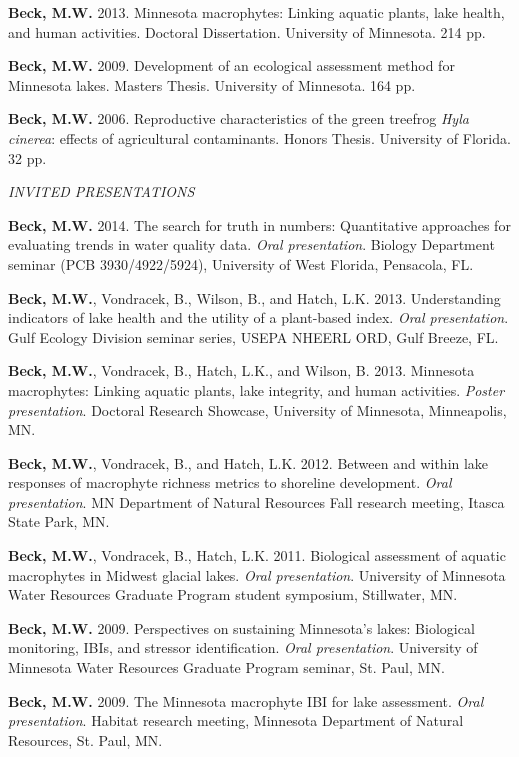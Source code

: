 \documentclass[letterpaper,12pt]{article}
\begin{document}
\textbf{Beck, M.W.} 2013. Minnesota macrophytes: Linking aquatic plants, lake health, and human activities. Doctoral Dissertation. University of Minnesota. 214 pp.

\textbf{Beck, M.W.} 2009. Development of an ecological assessment method for Minnesota lakes. Masters Thesis. University of Minnesota. 164 pp.

\textbf{Beck, M.W.} 2006. Reproductive characteristics of the green treefrog \textit{Hyla cinerea}: effects of agricultural contaminants. Honors Thesis. University of Florida. 32 pp.

\vspace{\baselineskip} 
\centerline{\large{\textit{INVITED PRESENTATIONS}}}

{\bf Beck, M.W.} 2014. The search for truth in numbers: Quantitative approaches for evaluating trends in water quality data. \textit{Oral presentation}. Biology Department seminar (PCB 3930/4922/5924), University of West Florida, Pensacola, FL. 

{\bf Beck, M.W.}, Vondracek, B., Wilson, B., and Hatch, L.K. 2013. Understanding indicators of lake health and the utility of a plant-based index. \textit{Oral presentation}. Gulf Ecology Division seminar series, USEPA NHEERL ORD, Gulf Breeze, FL.

{\bf Beck, M.W.}, Vondracek, B., Hatch, L.K., and Wilson, B. 2013. Minnesota macrophytes: Linking aquatic plants, lake integrity, and human activities. \textit{Poster presentation}. Doctoral Research Showcase, University of Minnesota, Minneapolis, MN.

{\bf Beck, M.W.}, Vondracek, B., and Hatch, L.K. 2012. Between and within lake responses of macrophyte richness metrics to shoreline development. \textit{Oral presentation}. MN Department of Natural Resources Fall research meeting, Itasca State Park, MN.

{\bf Beck, M.W.}, Vondracek, B., Hatch, L.K. 2011. Biological assessment of aquatic macrophytes in Midwest glacial lakes. \textit{Oral presentation}. University of Minnesota Water Resources Graduate Program student symposium, Stillwater, MN.

{\bf Beck, M.W.} 2009. Perspectives on sustaining Minnesota's lakes: Biological monitoring, IBIs, and stressor identification. \textit{Oral presentation}. University of Minnesota Water Resources Graduate Program seminar, St. Paul, MN.

{\bf Beck, M.W.} 2009. The Minnesota macrophyte IBI for lake assessment. \textit{Oral presentation}. Habitat research meeting, Minnesota Department of Natural Resources, St. Paul, MN.
\end{document}
